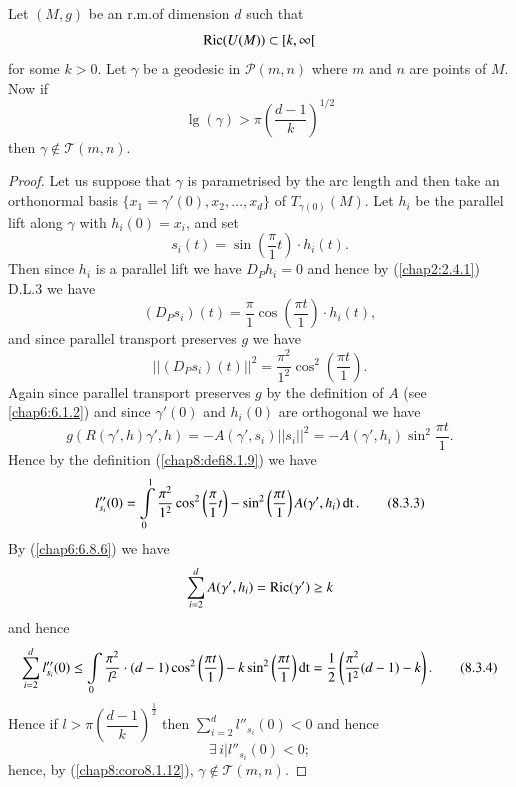 \begin{prop*}
Let $(M,g)$ be an r.m.\@ of dimension $d$ such that
$$
\operatorname{Ric}(U(M))\subset [k,\infty[
$$ 
for some $k>0$. Let $\gamma$ be a geodesic in $\mathscr{P}(m,n)$ where
$m$ and $n$ are points of $M$. Now if
$$
\lg(\gamma)>\pi\left(\frac{d-1}{k}\right)^{1/2}
$$
then \pageoriginale $\gamma\not\in \mathscr{T}(m,n)$.
\end{prop*}

\begin{proof}
Let us suppose that $\gamma$ is parametrised by the arc length and
then take an orthonormal basis
$\{x_{1}=\gamma'(0),x_{2},\ldots,x_{d}\}$ of $T_{\gamma(0)}(M)$. Let
$h_{i}$ be the parallel lift along $\gamma$ with $h_{i}(0)=x_{i}$, and
set
$$
s_{i}(t)=\sin\left(\frac{\pi}{1}t\right)\cdot h_{i}(t).
$$
Then since $h_{i}$ is a parallel lift we have $D_{P}h_{i}=0$ and hence
by (\ref{chap2:2.4.1}) D.L.3 we have
$$
(D_{P}s_{i})(t)=\frac{\pi}{1}\cos\left(\frac{\pi t}{1}\right)\cdot
h_{i}(t), 
$$
and since parallel transport preserves $g$ we have
\begin{equation*}
||(D_{P}s_{i})(t)||^{2}=\frac{\pi^{2}}{1^{2}}\cos^{2}\left(\frac{\pi
  t}{1}\right).\tag{8.3.2}\label{chap8:8.3.2} 
\end{equation*}
Again since parallel transport preserves $g$ by the definition of $A$
(see \eqref{chap6:6.1.2}) and since $\gamma'(0)$ and $h_{i}(0)$ are
orthogonal we have
$$
g(R(\gamma',h)\gamma',h)=-A(\gamma',s_{i})||s_{i}||^{2}=-A(\gamma',h_{i})\sin^{2}\frac{\pi
  t}{1}. 
$$
Hence by the definition (\ref{chap8:defi8.1.9}) we have
\begin{equation*}
l''_{s_{i}}(0)=\int\limits^{1}_{0}\frac{\pi^{2}}{1^{2}}\cos^{2}\left(\frac{\pi}{1}t\right)-\sin^{2}\left(\frac{\pi
  t}{1}\right)A(\gamma',h_{i})\operatorname{dt}.\tag{8.3.3}\label{chap8:8.3.3}
\end{equation*}
By (\ref{chap6:6.8.6}) we have
$$
\sum^{d}_{i=2}A(\gamma',h_{i})=\operatorname{Ric}(\gamma')\geq k
$$
and hence
\begin{equation*}
\sum^{d}_{i=2}l''_{s_{i}}(0)\leq
\int\limits_{0}\frac{\pi^{2}}{l^{2}}\cdot (d-1)\cos^{2}\left(\frac{\pi
  t}{1}\right)-k\sin^{2}\left(\frac{\pi t}{1}\right)\operatorname{dt}=\frac{1}{2}\left(\frac{\pi^{2}}{1^{2}}(d-1)-k\right).\tag{8.3.4}\label{chap8:8.3.4}
\end{equation*}
Hence \pageoriginale if
$l>\pi\left(\dfrac{d-1}{k}\right)^{\frac{1}{2}}$ then
$\sum\limits^{d}_{i=2}l''_{s_{i}}(0)<0$ and hence
$$
\exists\, i|l''_{s_{i}}(0)<0;
$$
hence, by (\ref{chap8:coro8.1.12}), $\gamma\not\in \mathscr{T}(m,n)$.
\end{proof}

